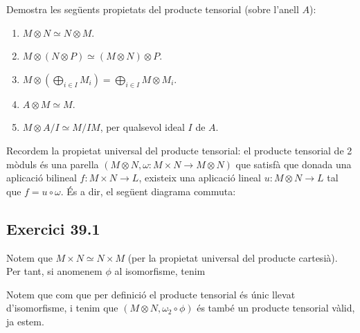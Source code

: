 \documentclass[11pt, a4paper]{article}
\begin{document}
\newpage
\begin{tcolorbox}[title=\section{Exercici 39}]
    Demostra les següents propietats del producte tensorial (sobre l'anell $A$):
\begin{enumerate}
    \item $M\otimes N\simeq N\otimes M$.
    \item $M\otimes(N\otimes P)\simeq (M\otimes N)\otimes P$.
    \item $M\otimes\left(\bigoplus_{i\in I}M_i\right)=\bigoplus_{i\in I}M\otimes M_i$.
    \item $A\otimes M\simeq M$.
    \item $M\otimes A/I\simeq M/IM$, per qualsevol ideal $I$ de $A$.
\end{enumerate}
\end{tcolorbox}
Recordem la propietat universal del producte tensorial: el producte tensorial de 2 mòduls és una parella $(M\otimes N, \omega:M\times N\to M\otimes N)$ que satisfà que donada una aplicació bilineal $f:M\times N\to L$, existeix una aplicació lineal $u: M\otimes N\to L$ tal que $f= u\circ \omega$. És a dir, el següent diagrama commuta:
\begin{center}
\end{center}
\subsection{Exercici 39.1}
Notem que $M\times N\simeq N\times M$ (per la propietat universal del producte cartesià). Per tant, si anomenem $\phi$ al isomorfisme, tenim
\begin{center}
\end{center}
Notem que com que per definició el producte tensorial és únic llevat d'isomorfisme, i tenim que $(M\otimes N, \omega_2\circ \phi)$ és també un producte tensorial vàlid, ja estem.
\end{document}
